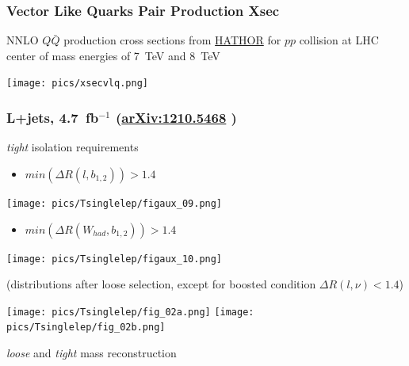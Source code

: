 \documentclass[xcolor=dvipsnames,10pt]{beamer}
\begin{document}
\begin{frame}[label=vlqXsec]\frametitle{Vector Like Quarks Pair Production Xsec}
\footnotesize\centering

NNLO $Q\bar{Q}$ production cross sections from \href{https://twiki.cern.ch/twiki/bin/view/Sandbox/CrossSectionsCalculationTool}{HATHOR} for $pp$ collision at LHC 
center of mass energies of 7~TeV and 8~TeV

\texttt{[image: pics/xsecvlq.png]}

\end{frame}



\begin{frame}[label=Tsinglelep]\frametitle{L+jets, 4.7~fb$^{-1}$ ({\small \href{http://arxiv.org/abs/1210.5468}{arXiv:1210.5468} \cite{ATLAS:2012qe}})} 
\footnotesize\centering


\begin{minipage}{.35\textwidth}
\centering 

\textit{tight} isolation requirements

\scriptsize
\begin{itemize}
\item $min(\Delta R(l,b_{1,2})) > 1.4$
\end{itemize}

\texttt{[image: pics/Tsinglelep/figaux\_09.png]}

\begin{itemize}
\item $min(\Delta R(W_{had},b_{1,2})) > 1.4$
\end{itemize}
\texttt{[image: pics/Tsinglelep/figaux\_10.png]}

{\tiny (distributions after loose selection, except for boosted condition $\Delta R(l,\nu)<1.4$)}

\end{minipage}\begin{minipage}{.65\textwidth}
\centering

\texttt{[image: pics/Tsinglelep/fig\_02a.png]}
\texttt{[image: pics/Tsinglelep/fig\_02b.png]}

\textit{loose} and \textit{tight} mass reconstruction

\end{minipage}


\end{frame}
\end{document}

